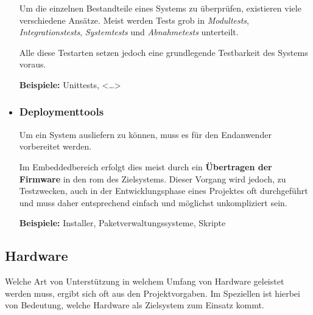\begin{itemize}
  Um die einzelnen Bestandteile eines Systems zu überprüfen, existieren viele
  verschiedene Ansätze. Meist werden Tests grob in \emph{Modultests},
  \emph{Integrationstests}, \emph{Systemtests} und \emph{Abnahmetests}
  unterteilt.
  
  Alle diese Testarten setzen jedoch eine grundlegende Testbarkeit des Systems
  voraus.
  
  \textbf{Beispiele:} Unittests, <\ldots>  
  \item \subsubsection*{Deploymenttools}\label{subs:deployment} Um ein System
  ausliefern zu können, muss es für den Endanwender vorbereitet werden.
  
  Im Embeddedbereich erfolgt dies meist durch ein \textbf{Übertragen der
  Firmware} in den \gls{rom} des Zielsystems. Dieser Vorgang wird jedoch, zu
  Testzwecken, auch in der Entwicklungsphase eines Projektes oft durchgeführt
  und muss daher entsprechend einfach und möglichst unkompliziert sein.
  
  \textbf{Beispiele:} Installer, Paketverwaltungssysteme, Skripte
\end{itemize}

\subsection{Hardware}\label{sub:hardware}
Welche Art von Unterstützung in welchem Umfang von Hardware geleistet werden
muss, ergibt sich oft aus den Projektvorgaben. Im Speziellen ist hierbei von
Bedeutung, welche Hardware als Zielsystem zum Einsatz kommt.

